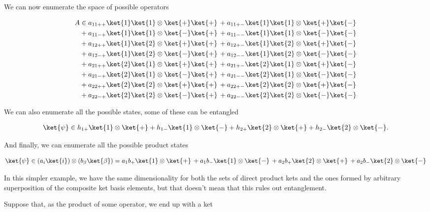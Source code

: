 We can now enumerate the space of possible operators

\begin{align*}
A &\in
a_{11++} \ket{1}\ket{1} \otimes \ket{+}\ket{+}
\,+ a_{11+-} \ket{1}\ket{1} \otimes \ket{+}\ket{-} \\
&+ a_{11-+} \ket{1}\ket{1} \otimes \ket{-}\ket{+}
\,+ a_{11--} \ket{1}\ket{1} \otimes \ket{-}\ket{-} \\
&+ a_{12++} \ket{1}\ket{2} \otimes \ket{+}\ket{+}
\,+ a_{12+-} \ket{1}\ket{2} \otimes \ket{+}\ket{-} \\
&+ a_{12-+} \ket{1}\ket{2} \otimes \ket{-}\ket{+}
\,+ a_{12--} \ket{1}\ket{2} \otimes \ket{-}\ket{-} \\
&+ a_{21++} \ket{2}\ket{1} \otimes \ket{+}\ket{+}
\,+ a_{21+-} \ket{2}\ket{1} \otimes \ket{+}\ket{-} \\
&+ a_{21-+} \ket{2}\ket{1} \otimes \ket{-}\ket{+}
\,+ a_{21--} \ket{2}\ket{1} \otimes \ket{-}\ket{-} \\
&+ a_{22++} \ket{2}\ket{2} \otimes \ket{+}\ket{+}
\,+ a_{22+-} \ket{2}\ket{2} \otimes \ket{+}\ket{-} \\
&+ a_{22-+} \ket{2}\ket{2} \otimes \ket{-}\ket{+}
\,+ a_{22--} \ket{2}\ket{2} \otimes \ket{-}\ket{-}
\end{align*}

We can also enumerate all the possible states, some of these can be entangled

\begin{align*}
\ket{\psi} \in h_{1+} \ket{1} \otimes \ket{+}
+ h_{1-} \ket{1} \otimes \ket{-}
+ h_{2+} \ket{2} \otimes \ket{+}
+ h_{2-} \ket{2} \otimes \ket{-}.
\end{align*}

And finally, we can enumerate all the possible product states

\begin{align*}
\ket{\psi} \in
 (a_{i} \ket{i}) \otimes (b_{\beta} \ket{\beta})
=
 a_{1} b_{+} \ket{1} \otimes \ket{+}
\,+ a_{1} b_{-} \ket{1} \otimes \ket{-}
\,+ a_{2} b_{+} \ket{2} \otimes \ket{+}
\,+ a_{2} b_{-} \ket{2} \otimes \ket{-}
\end{align*}

In this simpler example, we have the same dimensionality for both the sets of direct product kets and the ones formed by arbitrary superposition of the composite ket basis elements, but that doesn't mean that this rules out entanglement.

Suppose that, as the product of some operator, we end up with a ket

